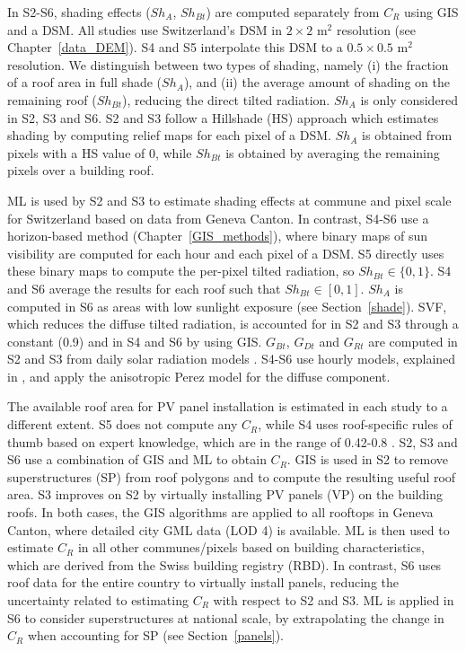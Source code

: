 In S2-S6, shading effects ($Sh_A$, $Sh_{Bt}$) are computed separately from $C_R$ using GIS and a DSM. All studies use Switzerland’s DSM in $2 \times 2$ m$^2$ resolution (see Chapter~\ref{data_DEM}). S4 and S5 interpolate this DSM to a $0.5 \times 0.5$ m$^2$ resolution. We distinguish between two types of shading, namely (i) the fraction of a roof area in full shade ($Sh_A$), and (ii) the average amount of shading on the remaining roof ($Sh_{Bt}$), reducing the direct tilted radiation. $Sh_A$ is only considered in S2, S3 and S6. S2 and S3 follow a Hillshade (HS) approach which estimates shading by computing relief maps for each pixel of a DSM. $Sh_A$ is obtained from pixels with a HS value of 0, while $Sh_{Bt}$ is obtained by averaging the remaining pixels over a building roof. 

ML is used by S2 and S3 to estimate shading effects at commune and pixel scale for Switzerland based on data from Geneva Canton. In contrast, S4-S6 use a horizon-based method (Chapter~\ref{GIS_methods}), where binary maps of sun visibility are computed for each hour and each pixel of a DSM. S5 directly uses these binary maps to compute the per-pixel tilted radiation, so $Sh_{Bt} \in \{0, 1\}$. S4 and S6 average the results for each roof such that $Sh_{Bt} \in [0, 1]$. $Sh_A$ is computed in S6 as areas with low sunlight exposure (see Section~\ref{shade}). SVF, which reduces the diffuse tilted radiation, is accounted for in S2 and S3 through a constant (0.9) and in S4 and S6 by using GIS. $G_{Bt}$, $G_{Dt}$ and $G_{Rt}$ are computed in S2 and S3 from daily solar radiation models \cite{assouline_quantifying_2017, assouline_large-scale_2018}. S4-S6 use hourly models, explained in \cite{perez_modeling_1990}, and apply the anisotropic Perez model for the diffuse component.

The available roof area for PV panel installation is estimated in each study to a different extent. S5 does not compute any $C_R$, while S4 uses roof-specific rules of thumb based on expert knowledge, which are in the range of 0.42-0.8 \cite{portmann_sonnendach.ch:_2016}. S2, S3 and S6 use a combination of GIS and ML to obtain $C_R$. GIS is used in S2 to remove superstructures (SP) from roof polygons and to compute the resulting useful roof area. S3 improves on S2 by virtually installing PV panels (VP) on the building roofs. In both cases, the GIS algorithms are applied to all rooftops in Geneva Canton, where detailed city GML data (LOD 4) is available. ML is then used to estimate $C_R$ in all other communes/pixels based on building characteristics, which are derived from the Swiss building registry (RBD). In contrast, S6 uses roof data for the entire country to virtually install panels, reducing the uncertainty related to estimating $C_R$ with respect to S2 and S3. ML is applied in S6 to consider superstructures at national scale, by extrapolating the change in $C_R$ when accounting for SP (see Section~\ref{panels}).

